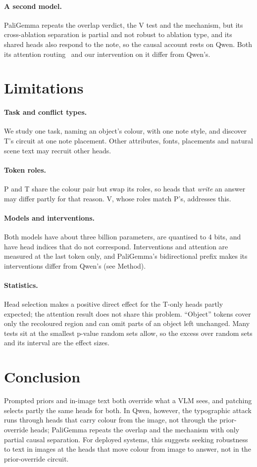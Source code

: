 \documentclass[letterpaper]{article}
\begin{document}
\paragraph{A second model.}
PaliGemma repeats the overlap verdict, the V test and the mechanism, but its
cross-ablation separation is partial and not robust to ablation type, and its
shared heads also respond to the note, so the causal account rests on Qwen.
Both its attention routing~\citep{lietzow2026} and our intervention on it differ from
Qwen's.

\section{Limitations}
\paragraph{Task and conflict types.} We study one task, naming an object's
colour, with one note style, and discover T's circuit at one note placement.
Other attributes, fonts, placements and natural scene text may recruit other
heads.
\paragraph{Token roles.} P and T share the colour pair but swap its roles, so
heads that \emph{write} an answer may differ partly for that reason. V, whose
roles match P's, addresses this.
\paragraph{Models and interventions.} Both models have about three billion
parameters, are quantised to 4 bits, and have head indices that do not
correspond. Interventions and attention are measured at the last token only,
and PaliGemma's bidirectional prefix makes its interventions differ from Qwen's
(see Method).
\paragraph{Statistics.} Head selection makes a positive direct effect for the
T-only heads partly expected; the attention result does not share this problem.
``Object'' tokens cover only the recoloured region and can omit parts of an
object left unchanged. Many tests sit at the smallest p-value \hTwoDraws{}
random sets allow, so the excess over random sets and its interval are the
effect sizes.

\section{Conclusion}
Prompted priors and in-image text both override what a VLM sees, and patching
selects partly the same heads for both. In Qwen, however, the typographic attack
runs through heads that carry colour from the image, not through the
prior-override heads; PaliGemma repeats the overlap and the mechanism with only
partial causal separation. For deployed systems, this suggests seeking
robustness to text in images at the heads that move colour from image to answer,
not in the prior-override circuit.
\end{document}
